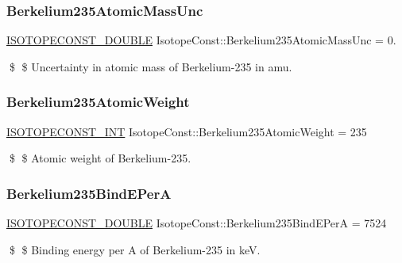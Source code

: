 \subsubsection{\texorpdfstring{Berkelium235\+Atomic\+Mass\+Unc}{Berkelium235AtomicMassUnc}}
{\footnotesize\ttfamily \mbox{\hyperlink{group___isotope_const-_macros_ga8f45a7272ce02c0b4c65c44636ed719a}{I\+S\+O\+T\+O\+P\+E\+C\+O\+N\+S\+T\+\_\+\+D\+O\+U\+B\+LE}} Isotope\+Const\+::\+Berkelium235\+Atomic\+Mass\+Unc = 0.}

\$ \$ Uncertainty in atomic mass of Berkelium-\/235 in amu. \mbox{\label{group___isotope_const-_berkelium-_bk235_gabf19b7e55cf59929415a10276dbf5932}} 
\subsubsection{\texorpdfstring{Berkelium235\+Atomic\+Weight}{Berkelium235AtomicWeight}}
{\footnotesize\ttfamily \mbox{\hyperlink{group___isotope_const-_macros_ga5f18360b3e99483a35c32d789e62621c}{I\+S\+O\+T\+O\+P\+E\+C\+O\+N\+S\+T\+\_\+\+I\+NT}} Isotope\+Const\+::\+Berkelium235\+Atomic\+Weight = 235}

\$ \$ Atomic weight of Berkelium-\/235. \mbox{\label{group___isotope_const-_berkelium-_bk235_ga5a854b7958dc9efd5765ba5efcbf11b1}} 
\subsubsection{\texorpdfstring{Berkelium235\+Bind\+E\+PerA}{Berkelium235BindEPerA}}
{\footnotesize\ttfamily \mbox{\hyperlink{group___isotope_const-_macros_ga8f45a7272ce02c0b4c65c44636ed719a}{I\+S\+O\+T\+O\+P\+E\+C\+O\+N\+S\+T\+\_\+\+D\+O\+U\+B\+LE}} Isotope\+Const\+::\+Berkelium235\+Bind\+E\+PerA = 7524}

\$ \$ Binding energy per A of Berkelium-\/235 in keV. \mbox{\label{group___isotope_const-_berkelium-_bk235_gaccc26fd4a3a546648d3002662207d766}} 
